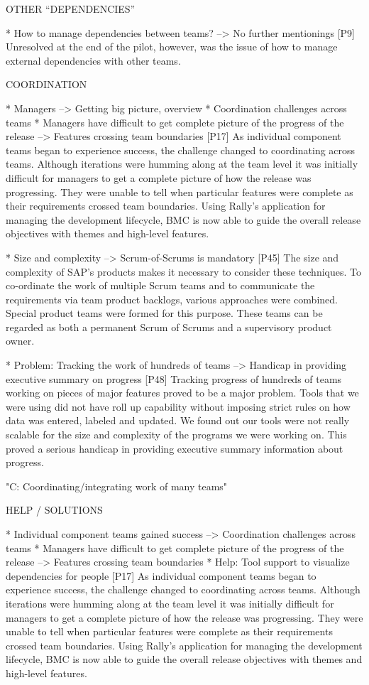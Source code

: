 \documentclass[preprint,authoryear,12pt]{elsarticle}
\begin{document}
OTHER ``DEPENDENCIES''

* How to manage dependencies between teams? --> No further mentionings
[P9]
Unresolved at the end of the pilot, however, was the issue of how to manage
external dependencies with other teams.


COORDINATION

* Managers --> Getting big picture, overview
* Coordination challenges across teams
* Managers have difficult to get complete picture of the progress of the release --> Features crossing team boundaries
[P17]
As individual component teams began to experience success, the challenge changed
to coordinating across teams. Although iterations were humming along at the team
level it was initially difficult for managers to get a complete picture of how
the release was progressing. They were unable to tell when particular features
were complete as their requirements crossed team boundaries.
Using Rally’s application for managing the development lifecycle, BMC is now
able to guide the overall release objectives with themes and high-level
features.


* Size and complexity --> Scrum-of-Scrums is mandatory 
[P45]
The size and complexity of SAP’s products makes it necessary to consider these
techniques. To co-ordinate the work of multiple Scrum teams and to communicate
the requirements via team product backlogs, various approaches were combined.
Special product teams were formed for this purpose. These teams can be regarded
as both a permanent Scrum of Scrums and a supervisory product owner.


* Problem: Tracking the work of hundreds of teams --> Handicap in providing executive summary on progress
[P48]
Tracking progress of hundreds of teams working on pieces of major features
proved to be a major problem. Tools that we were using did not have roll up
capability without imposing strict rules on how data was entered, labeled and
updated. We found out our tools were not really scalable for the size and
complexity of the programs we were working on. This proved a serious handicap in
providing executive summary information about progress.




"C: Coordinating/integrating work of many teams"


HELP / SOLUTIONS

* Individual component teams gained success --> Coordination challenges across teams
* Managers have difficult to get complete picture of the progress of the release --> Features crossing team boundaries
* Help: Tool support to visualize dependencies for people
[P17]
As individual component teams began to experience success, the challenge changed
to coordinating across teams. Although iterations were humming along at the team
level it was initially difficult for managers to get a complete picture of how
the release was progressing. They were unable to tell when particular features
were complete as their requirements crossed team boundaries.
Using Rally’s application for managing the development lifecycle, BMC is now
able to guide the overall release objectives with themes and high-level
features.
\end{document}
